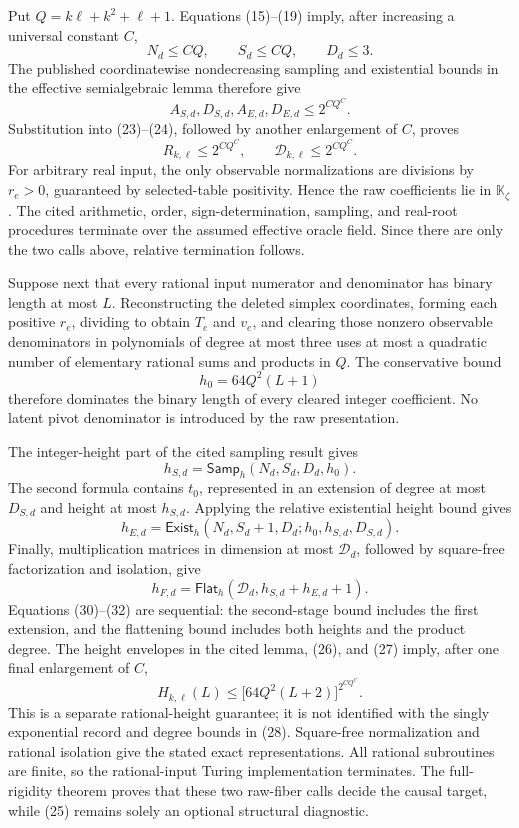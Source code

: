 Put \(Q=k\ell+k^2+\ell+1\).  Equations (15)--(19) imply, after increasing a universal constant \(C\),
\[
N_d\leq CQ,
\qquad S_d\leq CQ,
\qquad D_d\leq3.                                           \tag{26}
\]
The published coordinatewise nondecreasing sampling and existential bounds in the effective semialgebraic lemma therefore give
\[
A_{S,d},D_{S,d},A_{E,d},D_{E,d}
\leq2^{CQ^C}.                                                \tag{27}
\]
Substitution into (23)--(24), followed by another enlargement of \(C\), proves
\[
R_{k,\ell}\leq2^{CQ^C},
\qquad
\mathcal D_{k,\ell}\leq2^{CQ^C}.                           \tag{28}
\]
For arbitrary real input, the only observable normalizations are divisions by \(r_e>0\), guaranteed by selected-table positivity.  Hence the raw coefficients lie in \(\mathbb K_{\zeta}\).  The cited arithmetic, order, sign-determination, sampling, and real-root procedures terminate over the assumed effective oracle field.  Since there are only the two calls above, relative termination follows.

Suppose next that every rational input numerator and denominator has binary length at most \(L\).  Reconstructing the deleted simplex coordinates, forming each positive \(r_e\), dividing to obtain \(T_e\) and \(v_e\), and clearing those nonzero observable denominators in polynomials of degree at most three uses at most a quadratic number of elementary rational sums and products in \(Q\).  The conservative bound
\[
h_0=64Q^2(L+1)                                               \tag{29}
\]
therefore dominates the binary length of every cleared integer coefficient.  No latent pivot denominator is introduced by the raw presentation.

The integer-height part of the cited sampling result gives
\[
h_{S,d}=\mathsf{Samp}_h(N_d,S_d,D_d,h_0).                    \tag{30}
\]
The second formula contains \(t_0\), represented in an extension of degree at most \(D_{S,d}\) and height at most \(h_{S,d}\).  Applying the relative existential height bound gives
\[
h_{E,d}=\mathsf{Exist}_h
(N_d,S_d+1,D_d;h_0,h_{S,d},D_{S,d}).                         \tag{31}
\]
Finally, multiplication matrices in dimension at most \(\mathcal D_d\), followed by square-free factorization and isolation, give
\[
h_{F,d}=\mathsf{Flat}_h
(\mathcal D_d,h_{S,d}+h_{E,d}+1).                            \tag{32}
\]
Equations (30)--(32) are sequential: the second-stage bound includes the first extension, and the flattening bound includes both heights and the product degree.  The height envelopes in the cited lemma, (26), and (27) imply, after one final enlargement of \(C\),
\[
H_{k,\ell}(L)
\leq\bigl[64Q^2(L+2)\bigr]^{2^{CQ^C}}.                     \tag{33}
\]
This is a separate rational-height guarantee; it is not identified with the singly exponential record and degree bounds in (28).  Square-free normalization and rational isolation give the stated exact representations.  All rational subroutines are finite, so the rational-input Turing implementation terminates.  The full-rigidity theorem proves that these two raw-fiber calls decide the causal target, while (25) remains solely an optional structural diagnostic.
